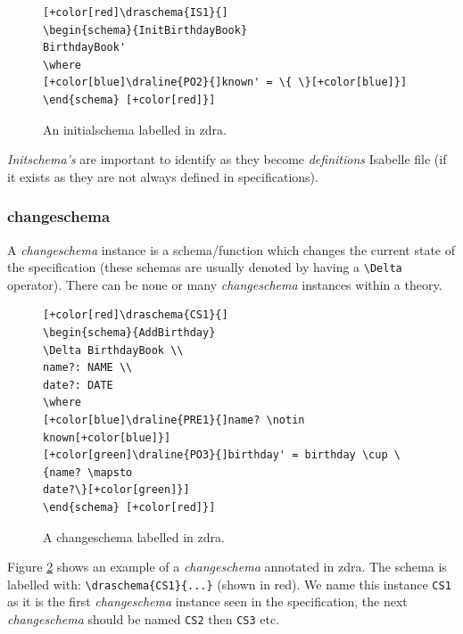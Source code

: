 \begin{figure}[H]
\centering
\begin{footnotesize}
\begin{BVerbatim}[commandchars=+\[\]]
[+color[red]\draschema{IS1}{]
\begin{schema}{InitBirthdayBook} 
BirthdayBook' 
\where 
[+color[blue]\draline{PO2}{]known' = \{ \}[+color[blue]}]
\end{schema} [+color[red]}]
\end{BVerbatim}
\caption{\label{fig:exampleofis} An initialschema labelled in \gls{zdra}.}
\end{footnotesize}
\end{figure}

\emph{Initschema's} are important to identify as they become \emph{definitions}
Isabelle file (if it exists as they are not always defined in specifications).

\subsubsection{changeschema}

A \emph{changeschema} instance is a schema/function which changes the current
state of the specification (these schemas are usually denoted by having a
\verb|\Delta| operator). There can be none or many \emph{changeschema} instances
within a theory.

\begin{center}
\begin{figure}[H]
\centering
\begin{footnotesize}
\begin{BVerbatim}[commandchars=+\[\]]
[+color[red]\draschema{CS1}{]
\begin{schema}{AddBirthday}
\Delta BirthdayBook \\
name?: NAME \\
date?: DATE
\where
[+color[blue]\draline{PRE1}{]name? \notin known[+color[blue]}]
[+color[green]\draline{PO3}{]birthday' = birthday \cup \{name? \mapsto
date?\}[+color[green]}]
\end{schema} [+color[red]}]
\end{BVerbatim}
\end{footnotesize}
\caption{\label{fig:exampleofcs} A changeschema labelled in \gls{zdra}.}
\end{figure}
\end{center}

Figure \ref{fig:exampleofcs} shows an example of a \emph{changeschema} annotated
in \gls{zdra}. The schema is labelled with: \verb|\draschema{CS1}{...}| (shown
in red). We name this instance \verb|CS1| as it is the first \emph{changeschema}
instance seen in the specification, the next \emph{changeschema} should be named
\verb|CS2| then \verb|CS3| etc.

